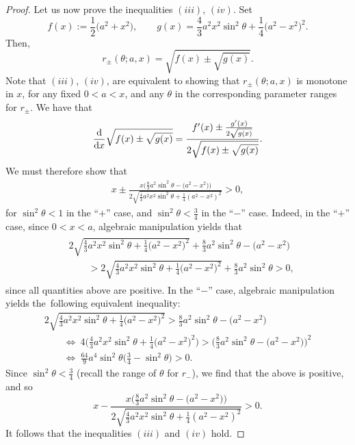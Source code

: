 \documentclass[pdftex]{sigma}
\numberwithin{equation}{section}
\begin{document}
\begin{proof}
Let us now prove the inequalities $(iii)$, $(iv)$. Set
\[
f(x) :=\frac{1}{2}\bigl(a^2+x^2\bigr), \qquad g(x) = \frac{4}{3}a^2x^2\sin^2\theta +\frac{1}{4}\bigl(a^2-x^2\bigr)^2.
\]
Then,
 \begin{equation*}
 r_{\pm}(\theta;a,x) = \sqrt{f(x) \pm \sqrt{g(x)}}.
 \end{equation*}
Note that $(iii)$, $(iv)$, are equivalent to showing that $r_{\pm}(\theta;a,x) $ is monotone in $x$, for any fixed $0< a < x$, and any $\theta$ in the corresponding parameter ranges for $r_{\pm}$.
We have that
 \begin{equation*}
 \frac{\rm d}{{\rm d}x} \sqrt{f(x) \pm \sqrt{g(x)}} =
 \frac{f'(x) \pm \frac{g'(x)}{2\sqrt{g(x)}}}{2\sqrt{f(x) \pm \sqrt{g(x)}}}.
 \end{equation*}
We must therefore show that
 \begin{align*}
 x \pm \frac{x\bigl(\frac{8}{3}a^2\sin^2\theta - \bigl(a^2-x^2\bigr)\bigr)}{2\sqrt{\frac{4}{3}a^2x^2\sin^2\theta + \frac{1}{4}(a^2-x^2)^2}} >0,
 \end{align*}
for $\sin^2\theta < 1$ in the ``$+$'' case, and $\sin^2\theta <\frac{3}{4}$ in the ``$-$'' case. Indeed, in the ``$+$'' case, since $0<x<a$,
algebraic manipulation yields that
 \begin{gather*}
\begin{split}
& 2\sqrt{\frac{4}{3}a^2x^2\sin^2\theta + \frac{1}{4}\bigl(a^2-x^2\bigr)^2} + \frac{8}{3}a^2\sin^2\theta - \bigl(a^2-x^2\bigr) \\
& \qquad{}> 2\sqrt{\frac{4}{3}a^2x^2\sin^2\theta + \frac{1}{4}\bigl(a^2-x^2\bigr)^2} + \frac{8}{3}a^2\sin^2\theta > 0,
\end{split}
 \end{gather*}
since all quantities above are positive. In the ``$-$'' case, algebraic manipulation yields the~following equivalent inequality:
 \begin{gather*}
 2\sqrt{\frac{4}{3}a^2x^2\sin^2\theta + \frac{1}{4}\bigl(a^2-x^2\bigr)^2}> \frac{8}{3}a^2\sin^2\theta - \bigl(a^2-x^2\bigr)\\
 \qquad{}\Longleftrightarrow \ 4\biggl(\frac{4}{3}a^2x^2\sin^2\theta + \frac{1}{4}\bigl(a^2-x^2\bigr)^2\biggr) > \biggl(\frac{8}{3}a^2\sin^2\theta - \bigl(a^2-x^2\bigr)\biggr)^2\\
 \qquad{}\Longleftrightarrow \ \frac{64}{9}a^4\sin^2\theta\biggl(\frac{3}{4}-\sin^2\theta\biggr) > 0.
 \end{gather*}
Since $\sin^2\theta <\frac{3}{4}$ (recall the range of $\theta$ for $r_-$), we find that the above is positive, and so{\samepage
 \begin{equation*}
 x - \frac{x\bigl(\frac{8}{3}a^2\sin^2\theta - \bigl(a^2-x^2\bigr)\bigr)}{2\sqrt{\frac{4}{3}a^2x^2\sin^2\theta + \frac{1}{4}(a^2-x^2)^2}} >0.
 \end{equation*}
It follows that the inequalities $(iii)$ and $(iv)$ hold.}


\end{proof}
\end{document}
